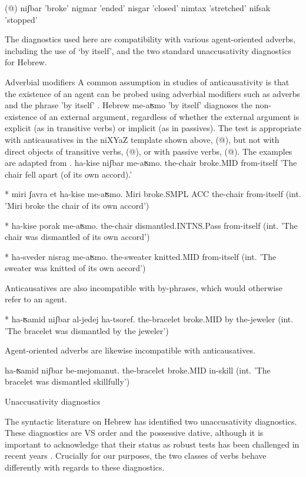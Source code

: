(@) niʃbar   'broke'
    nigmar   'ended'
    nisgar   'closed'
    nimtax   'stretched'
    nifsak  'stopped'

The diagnostics used here are compatibility with various agent-oriented adverbs, including the use of ‘by itself’, and the two standard unaccusativity diagnostics for Hebrew.

Adverbial modifiers
A common assumption in studies of anticausativity is that the existence of an agent can be probed using adverbial modifiers such as adverbs and the phrase 'by itself' \citep{unaccusativity95,alexiadouanagnostopoulou04,koontzgarboden09,alexiadoudoron12,kastner17gjgl}. Hebrew me-aʦmo 'by itself' diagnoses the non-existence of an external argument, regardless of whether the external argument is explicit (as in transitive verbs) or implicit (as in passives). The test is appropriate with anticausatives in the niXYaZ template shown above, (@), but not with direct objects of transitive verbs, (@), or with passive verbs, (@). The examples are adapted from \cite{kastner17gjgl}.
    ha-kise niʃbar me-aʦmo.
       the-chair broke.MID from-itself
       'The chair fell apart (of its own accord).'
    
* miri ʃavra et ha-kise me-aʦmo.
       Miri broke.SMPL ACC the-chair from-itself
         (int. 'Miri broke the chair of its own accord')
     
         * ha-kise porak me-aʦmo.
         the-chair dismantled.INTNS.Pass from-itself
         (int. 'The chair was dismantled of its own accord')
    
         * ha-sveder nisrag me-aʦmo.
         the-sweater knitted.MID from-itself
         (int. 'The sweater was knitted of its own accord')
    
Anticausatives are also incompatible with by-phrases, which would otherwise refer to an agent.

     * ha-ʦamid niʃbar al-jedej ha-tsoref.
     the-bracelet broke.MID by the-jeweler
     (int. 'The bracelet was dismantled by the jeweler')

Agent-oriented adverbs are likewise incompatible with anticausatives.

     ha-ʦamid niʃbar be-mejomanut.
     the-bracelet broke.MID in-skill
     (int. 'The bracelet was dismantled skillfully')
 
Unaccusativity diagnostics

The syntactic literature on Hebrew has identified two unaccusativity diagnostics. These diagnostics are VS order and the possessive dative, although it is important to acknowledge that their status as robust tests has been challenged in recent years \citep{gafter14li,linzen14pd,kastner17gjgl}. Crucially for our purposes, the two classes of verbs behave differently with regards to these diagnostics.

